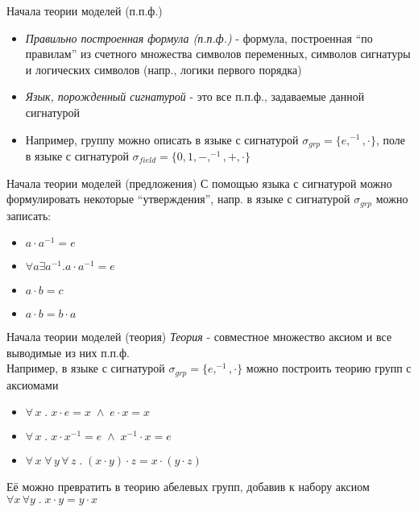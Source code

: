 \documentclass{beamer}
\begin{document}
\begin{frame}{Начала теории моделей (п.п.ф.)}
  \begin{itemize}
    \item \textit{Правильно построенная формула (п.п.ф.)} - формула, построенная ``по правилам'' из счетного множества символов переменных, символов сигнатуры и логических символов (напр., логики первого порядка)
    \item \textit{Язык, порожденный сигнатурой} - это все п.п.ф., задаваемые данной сигнатурой
    \item Например, группу можно описать в языке с сигнатурой $\sigma_{grp} = \{e, ^{-1}, \cdot\}$, поле в языке с сигнатурой $\sigma_{field} = \{0, 1, -, ^{-1}, +, \cdot\}$
  \end{itemize}
\end{frame}

\begin{frame}{Начала теории моделей (предложения)}
С помощью языка с сигнатурой можно формулировать некоторые ``утверждения'', напр. в языке с сигнатурой $\sigma_{grp}$ можно записать:
  \begin{itemize}
    \item $a \cdot a^{-1} = e$
    \item $\forall a \exists a^{-1} . a \cdot a^{-1} = e$
    \item $a \cdot b = c$
    \item $a \cdot b = b \cdot a$
  \end{itemize}
\end{frame}

\begin{frame}{Начала теории моделей (теория)}
\textit{Теория} - совместное множество аксиом и все выводимые из них п.п.ф.\\
\bigskip
Например, в языке с сигнатурой $\sigma_{grp} = \{e, ^{-1}, \cdot\}$ можно построить теорию групп с аксиомами\\
  \begin{itemize}
    \item $\forall \, x \; . \; x \cdot e = x \; \wedge \; e \cdot x = x$ 
    \item $\forall \, x \; . \;x \cdot x^{-1} = e \; \wedge \; x^{-1} \cdot x = e$ 
    \item $\forall \, x \; \forall \, y \, \forall \, z \; . \; (x \cdot y) \cdot z = x \cdot (y \cdot z)$
  \end{itemize}
Её можно превратить в теорию абелевых групп, добавив к набору аксиом $\forall x \, \forall y \; . \; x \cdot y = y \cdot x$
\end{frame}
\end{document}
